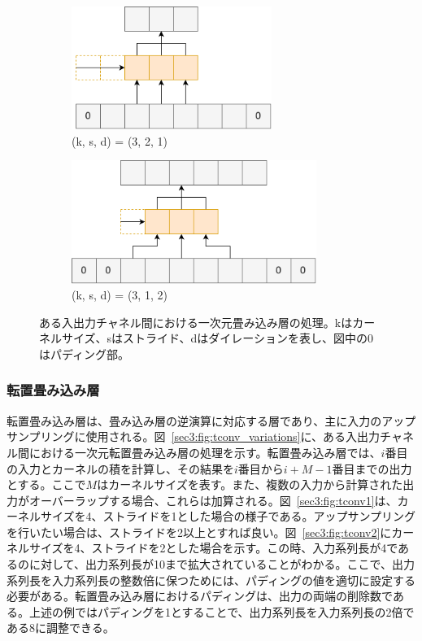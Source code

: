 \documentclass[12pt]{jarticle}
\numberwithin{equation}{section}    %
\numberwithin{figure}{section}      %
\numberwithin{table}{section}      %
\begin{document}
\begin{figure}[tb]
    \begin{subfigure}[b]{0.48\textwidth}
        \centering
        \includegraphics[height=4cm]{./figure/sec3/conv3.drawio.png}
        \caption{(k, s, d) = (3, 2, 1)}
        \label{sec3:fig:conv3}
    \end{subfigure}
    \begin{subfigure}[b]{0.48\textwidth}
        \centering
        \includegraphics[height=4cm]{./figure/sec3/conv4.drawio.png}
        \caption{(k, s, d) = (3, 1, 2)}
        \label{sec3:fig:conv4}
    \end{subfigure}
    \caption{ある入出力チャネル間における一次元畳み込み層の処理。kはカーネルサイズ、sはストライド、dはダイレーションを表し、図中の0はパディング部。}
    \label{sec3:fig:conv_variations}
\end{figure}

\subsubsection{転置畳み込み層}
転置畳み込み層は、畳み込み層の逆演算に対応する層であり、主に入力のアップサンプリングに使用される。図~\ref{sec3:fig:tconv_variations}に、ある入出力チャネル間における一次元転置畳み込み層の処理を示す。転置畳み込み層では、$i$番目の入力とカーネルの積を計算し、その結果を$i$番目から$i + M - 1$番目までの出力とする。ここで$M$はカーネルサイズを表す。また、複数の入力から計算された出力がオーバーラップする場合、これらは加算される。図~\ref{sec3:fig:tconv1}は、カーネルサイズを4、ストライドを1とした場合の様子である。アップサンプリングを行いたい場合は、ストライドを2以上とすれば良い。図~\ref{sec3:fig:tconv2}にカーネルサイズを4、ストライドを2とした場合を示す。この時、入力系列長が4であるのに対して、出力系列長が10まで拡大されていることがわかる。ここで、出力系列長を入力系列長の整数倍に保つためには、パディングの値を適切に設定する必要がある。転置畳み込み層におけるパディングは、出力の両端の削除数である。上述の例ではパディングを1とすることで、出力系列長を入力系列長の2倍である8に調整できる。
\end{document}

